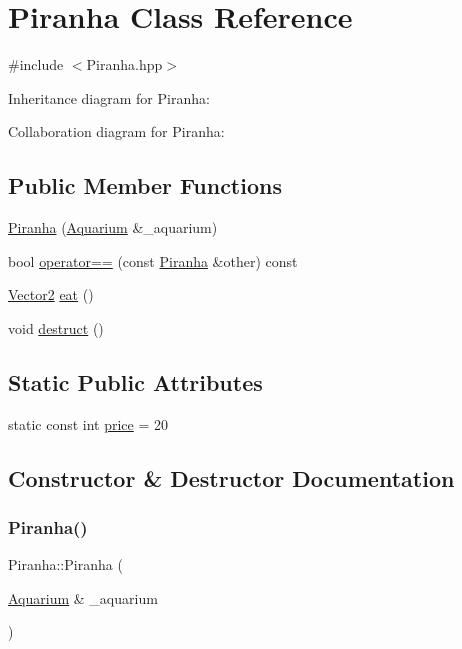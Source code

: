 \hypertarget{class_piranha}{}\section{Piranha Class Reference}
\label{class_piranha}


{\ttfamily \#include $<$Piranha.\+hpp$>$}



Inheritance diagram for Piranha\+:


Collaboration diagram for Piranha\+:
\subsection*{Public Member Functions}
\begin{DoxyCompactItemize}
\item 
\mbox{\hyperlink{class_piranha_a879b041f0a4bef2e837ee6dab37f7bc8}{Piranha}} (\mbox{\hyperlink{class_aquarium}{Aquarium}} \&\+\_\+aquarium)
\item 
bool \mbox{\hyperlink{class_piranha_ad374828e737e57a663689f5d54c9cf14}{operator==}} (const \mbox{\hyperlink{class_piranha}{Piranha}} \&other) const
\item 
\mbox{\hyperlink{struct_vector2}{Vector2}} \mbox{\hyperlink{class_piranha_a125847235bdbd0e8c676dcada0d86c14}{eat}} ()
\item 
void \mbox{\hyperlink{class_piranha_a79c586a13bed4fb4aaa1b99c41c93c5a}{destruct}} ()
\end{DoxyCompactItemize}
\subsection*{Static Public Attributes}
\begin{DoxyCompactItemize}
\item 
static const int \mbox{\hyperlink{class_piranha_a5cab361b7ab7133245dc8a54a1d8addb}{price}} = 20
\end{DoxyCompactItemize}


\subsection{Constructor \& Destructor Documentation}
\mbox{\label{class_piranha_a879b041f0a4bef2e837ee6dab37f7bc8}} 
\subsubsection{\texorpdfstring{Piranha()}{Piranha()}}
{\footnotesize\ttfamily Piranha\+::\+Piranha (\begin{DoxyParamCaption}\item[{\mbox{\hyperlink{class_aquarium}{Aquarium}} \&}]{\+\_\+aquarium }\end{DoxyParamCaption})}



